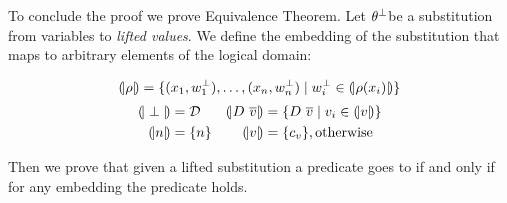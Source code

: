 \renewcommand\botsto{\ensuremath{\theta^\ebot}}
To conclude the proof we prove Equivalence Theorem.
Let \botsto be a substitution from variables to \textit{lifted values}.
We define the embedding of the substitution \embed{\botsto}
that maps \ebot to arbitrary elements of the logical domain:


\begin{definition}
$$
(\!|\rho|\!)=
	\{(x_1, w^\perp_1), \dots, (x_n, w^\perp_n) \mid w^\perp_i \in (\!|\rho(x_i)|\!)  \}
$$
\begin{align*}
\instance{\ebot}& = \dom &
\instance{D\ \overline{v}} &= 
	\{ D\ \overline{v} \mid v_i \in \instance{v} \} \\ 
\instance{n} &= \{n\} &
\instance{v} &= \{c_v\}, \text{otherwise}
\end{align*}
\end{definition}

Then we prove that
given a lifted substitution a predicate goes to \etrue
if and only if for any embedding the
predicate holds.

